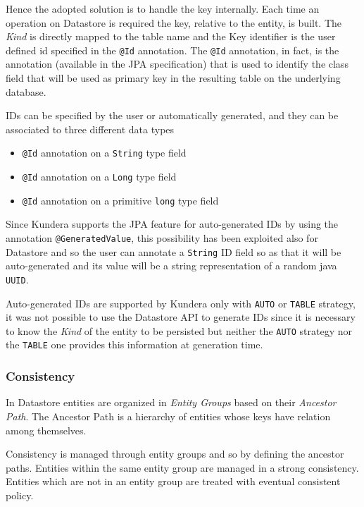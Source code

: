 \noindent Hence the adopted solution is to handle the key internally. Each time an operation on Datastore is required the key, relative to the entity, is built. The \textit{Kind} is directly mapped to the table name and the Key identifier is the user defined id specified in the \texttt{@Id} annotation.
The \texttt{@Id} annotation, in fact, is the annotation (available in the JPA specification) that is used to identify the class field that will be used as primary key in the resulting table on the underlying database.

\newparagraph IDs can be specified by the user or automatically generated, and they can be associated to three different data types
\begin{itemize}
\item \texttt{@Id} annotation on a \texttt{String} type field
\item \texttt{@Id} annotation on a \texttt{Long} type field
\item \texttt{@Id} annotation on a primitive \texttt{long} type field
\end{itemize}

\noindent Since Kundera supports the JPA feature for auto-generated IDs by using the annotation \texttt{@GeneratedValue}, this possibility has been exploited also for Datastore and so the user can annotate a \texttt{String} ID field so as that it will be auto-generated and its value will be a string representation of a random java \texttt{UUID}.

\noindent Auto-generated IDs are supported by Kundera only with \texttt{AUTO} or \texttt{TABLE} strategy, it was not possible to use the Datastore API to generate IDs since it is necessary to know the \textit{Kind} of the entity to be persisted but neither the \texttt{AUTO} strategy nor the \texttt{TABLE} one provides this information at generation time.

\subsubsection{Consistency}
In Datastore entities are organized in \textit{Entity Groups} based on their \textit{Ancestor Path}. The Ancestor Path is a hierarchy of entities whose keys have relation among themselves.

\noindent Consistency is managed through entity groups and so by defining the ancestor paths. Entities within the same entity group are managed in a strong consistency. Entities which are not in an entity group are treated with eventual consistent policy.

